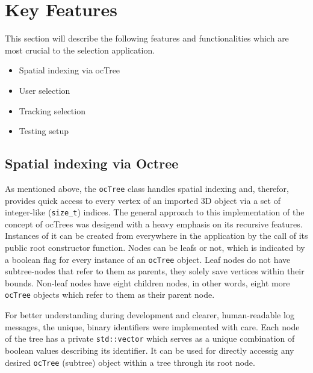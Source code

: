 \section{Key Features}
\label{sec:key_features}
This section will describe the following features and functionalities which are most crucial to the selection application.

\begin{itemize}  
	\item Spatial indexing via ocTree
	\item User selection
	\item Tracking selection
	\item Testing setup 
\end{itemize}

\subsection{Spatial indexing via Octree}
\label{sec:spatial_indexing_via_octree}

As mentioned above, the \texttt{ocTree} class handles spatial indexing and, therefor, provides quick access to every vertex of an imported 3D object via a set of integer-like (\texttt{size\_t}) indices. The general approach to this implementation of the concept of ocTrees was desigend with a heavy emphasis on its recursive features. Instances of it can be created from everywhere in the application by the call of its public root constructor function. Nodes can be leafs or not, which is indicated by a boolean flag for every instance of an \texttt{ocTree} object. Leaf nodes do not have subtree-nodes that refer to them as parents, they solely save vertices within their bounds. Non-leaf nodes have eight children nodes, in other words, eight more \texttt{ocTree} objects which refer to them as their parent node.

For better understanding during development and clearer, human-readable log messages, the unique, binary identifiers were implemented with care. Each node of the tree has a private \texttt{std::vector} which serves as a unique combination of boolean values describing its identifier. It can be used for directly accessig any desired \texttt{ocTree} (subtree) object within a tree through its root node.

